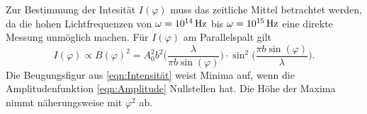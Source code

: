 Zur Bestimmung der Intesität $I(\varphi)$ muss das zeitliche Mittel betrachtet
werden, da die hohen Lichtfrequenzen von $\omega = 10^{14}\,\si{\hertz}$ bis $\omega = 10^{15}\,\si{\hertz}$
eine direkte Messung unmöglich machen. Für $I(\varphi)$ am Parallelspalt gilt
\begin{equation}
  I(\varphi) \propto B(\varphi)^2 = A_0^2b^2 \bigg(\frac{\lambda}{\pi b \sin{(\varphi)}}\bigg)
  \cdot \sin^2{\bigg(\frac{\pi b \sin{(\varphi)}}{\lambda}\bigg)}.
  \label{eqn:Intensität}
\end{equation}
Die Beugungsfigur aus \eqref{eqn:Intensität} weist Minima auf, wenn die
Amplitudenfunktion \eqref{eqn:Amplitude} Nullstellen hat. Die Höhe der Maxima
nimmt näherungsweise mit $\varphi^2$ ab.
